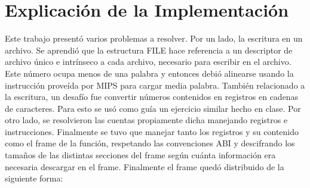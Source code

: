 \documentclass[a4paper,10pt]{article}
\begin{document}
\section{Explicaci\'on de la Implementaci\'on}
Este trabajo present\'o varios problemas a resolver. 
Por un lado, la escritura en un archivo. Se aprendi\'o que la estructura FILE hace referencia a un 
descriptor de archivo \'unico e intr\'inseco a cada archivo, necesario para escribir en el archivo. 
Este n\'umero ocupa menos de una palabra y entonces debi\'o alinearse usando la instrucci\'on 
prove\'ida por MIPS para cargar media palabra. 
También relacionado a la escritura, un desaf\'io fue convertir n\'umeros contenidos en registros en 
cadenas de caracteres. Para esto se us\'o como gu\'ia un ejercicio similar hecho en clase. 
Por otro lado, se resolvieron las cuentas propiamente dicha manejando registros e instrucciones. 
Finalmente se tuvo que manejar tanto los registros y su contenido como el frame de la funci\'on, 
respetando las convenciones ABI y descifrando los tamaños de las distintas secciones del frame seg\'un 
cu\'anta informaci\'on era necesaria descargar en el frame.
Finalmente el frame qued\'o distribuido de la siguiente forma:
\end{document}
